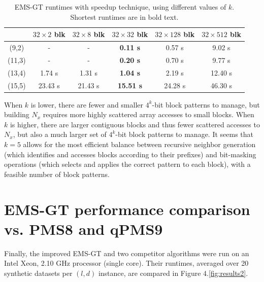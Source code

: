 \documentclass[oneside,12pt]{DISCSthesis}
\begin{document}
{\begin{table}[h]
\begin{tabular}{|c|c|c|c|c|c|}
			\bfseries &
			\bfseries\boldmath $32 \times   2$ blk &
			\bfseries\boldmath $32 \times   8$ blk &
			\bfseries\boldmath $32 \times  32$ blk &
			\bfseries\boldmath $32 \times 128$ blk &
			\bfseries\boldmath $32 \times 512$ blk \\
			\hline
			 (9,2) 	&    -   &    -     & {\bf  0.11 s} &  0.57 s &  9.02 s \\
			(11,3) 	&    -   &    -     & {\bf  0.20 s} &  0.70 s &  9.77 s \\
			(13,4) 	&  1.74 s &  1.31 s & {\bf  1.04 s} &  2.19 s & 12.40 s \\
			(15,5) 	& 23.43 s & 21.43 s & {\bf 15.51 s} & 24.28 s & 46.30 s \\
			\hline
			\end{tabular}
			\centering
			\caption{\small EMS-GT runtimes with speedup technique, using different values of $k$. Shortest runtimes are in bold text.}
			\end{table}

		When $k$ is lower, there are fewer and smaller $4^k$-bit block patterns to manage, but building $N_x$ requires more highly scattered array accesses to small blocks. When $k$ is higher, there are larger contiguous blocks and thus fewer scattered accesses to $N_x$, but also a much larger set of $4^k$-bit block patterns to manage. It seems that $k=5$ allows for the most efficient balance between recursive neighbor generation (which identifies and accesses blocks according to their prefixes) and bit-masking operations (which selects and applies the correct pattern to each block), with a feasible number of block patterns.

	\section{EMS-GT performance comparison vs. PMS8 and qPMS9}
		Finally, the improved EMS-GT and two competitor algorithms were run on an Intel Xeon, 2.10 GHz processor (single core). Their runtimes, averaged over 20 synthetic datasets per $(l,d)$ instance, are compared in Figure 4.\ref{fig:results2}.

}
\end{document}
